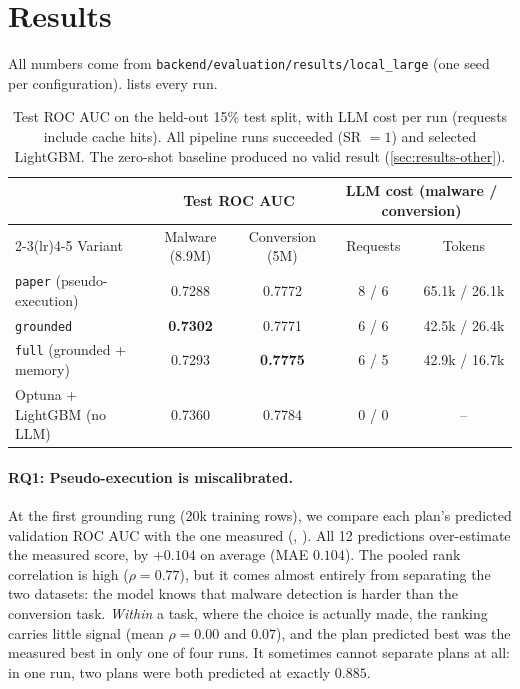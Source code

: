 \section{Results}
\label{sec:results}

All numbers come from \texttt{backend/evaluation/results/local\_large} (one seed per configuration).  lists every run.

\begin{table}[t]
  \centering
  \caption{Test ROC AUC on the held-out 15\% test split, with LLM cost per run (requests include cache hits). All pipeline runs succeeded (SR $= 1$) and selected LightGBM. The zero-shot baseline produced no valid result (\cref{sec:results-other}).}
  \label{tab:main}
  \small
  \begin{tabular}{lcccc}
    \toprule
     & \multicolumn{2}{c}{Test ROC AUC} & \multicolumn{2}{c}{LLM cost (malware / conversion)} \\
    \cmidrule(lr){2-3}\cmidrule(lr){4-5}
    Variant & Malware (8.9M) & Conversion (5M) & Requests & Tokens \\
    \midrule
    \texttt{paper} (pseudo-execution) & 0.7288 & 0.7772 & 8 / 6 & 65.1k / 26.1k \\
    \texttt{grounded} & \textbf{0.7302} & 0.7771 & 6 / 6 & 42.5k / 26.4k \\
    \texttt{full} (grounded + memory) & 0.7293 & \textbf{0.7775} & 6 / 5 & 42.9k / 16.7k \\
    \midrule
    Optuna + LightGBM (no LLM) & 0.7360 & 0.7784 & 0 / 0 & -- \\
    \bottomrule
  \end{tabular}
\end{table}

\paragraph{RQ1: Pseudo-execution is miscalibrated.} At the first grounding rung (20k training rows), we compare each plan's predicted validation ROC AUC with the one measured (, ). All 12 predictions over-estimate the measured score, by $+0.104$ on average (MAE $0.104$). The pooled rank correlation is high ($\rho = 0.77$), but it comes almost entirely from separating the two datasets: the model knows that malware detection is harder than the conversion task. \emph{Within} a task, where the choice is actually made, the ranking carries little signal (mean $\rho = 0.00$ and $0.07$), and the plan predicted best was the measured best in only one of four runs. It sometimes cannot separate plans at all: in one run, two plans were both predicted at exactly $0.885$.

